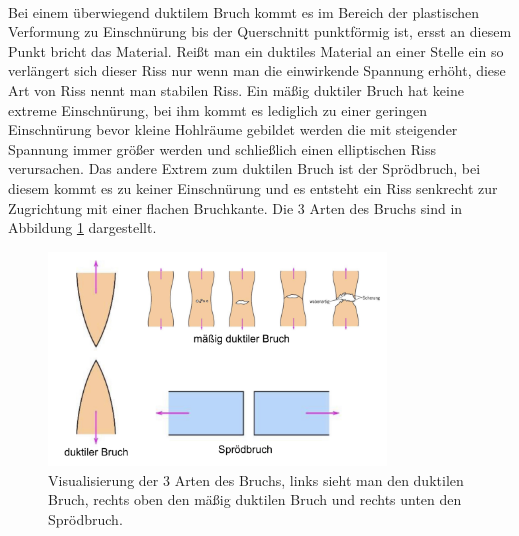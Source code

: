 \documentclass[11pt,a4paper]{article}
\numberwithin{equation}{section}
\numberwithin{figure}{section}
\begin{document}
\\
\begin{addmargin}[25pt]{0pt}
Bei einem überwiegend duktilem Bruch kommt es im Bereich der plastischen Verformung zu Einschnürung bis der Querschnitt punktförmig ist, ersst an diesem Punkt bricht das Material. Reißt man ein duktiles Material an einer Stelle ein so verlängert sich dieser Riss nur wenn man die einwirkende Spannung erhöht, diese Art von Riss nennt man stabilen Riss. Ein mäßig duktiler Bruch hat keine extreme Einschnürung, bei ihm kommt es lediglich zu einer geringen Einschnürung bevor kleine Hohlräume gebildet werden die mit steigender Spannung immer größer werden und schließlich einen elliptischen Riss verursachen. Das andere Extrem zum duktilen Bruch ist der Sprödbruch, bei diesem kommt es zu keiner Einschnürung und es entsteht ein Riss senkrecht zur Zugrichtung mit einer flachen Bruchkante. Die 3 Arten des Bruchs sind in Abbildung \ref{fig:Brucharten} dargestellt.\\
\begin{figure}[h]
    \centering
    \includegraphics[width = 0.8\textwidth]{images/Materialwissenschaften/Brucharten.jpeg}
    \caption{Visualisierung der 3 Arten des Bruchs, links sieht man den duktilen Bruch, rechts oben den mäßig duktilen Bruch und rechts unten den Sprödbruch.}
    \label{fig:Brucharten}
\end{figure}
\end{addmargin}
\end{document}
